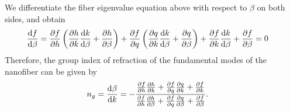 \documentclass[preprint,aps,pra,onecolumn]{revtex4-1} %
\begin{document}
We differentiate the fiber eigenvalue equation above with respect to $ \beta $ on both sides, and obtain
\begin{align}
\dd{f}{\beta} &= \pp{f}{h} \left(\pp{h}{k}\dd{k}{\beta}+\pp{h}{\beta} \right) + \pp{f}{q}\left(\pp{q}{k}\dd{k}{\beta}+\pp{q}{\beta} \right) +\pp{f}{k}\dd{k}{\beta}+\pp{f}{\beta}=0
\end{align}
Therefore, the group index of refraction of the fundamental modes of the nanofiber can be given by
\begin{align}
 n_g &= \dd{\beta}{k} = -\frac{\pp{f}{h}\pp{h}{k}+\pp{f}{q}\pp{q}{k}+\pp{f}{k}}
{\pp{f}{h}\pp{h}{\beta}+\pp{f}{q}\pp{q}{\beta}+\pp{f}{\beta}}.
\end{align}

\end{document}
